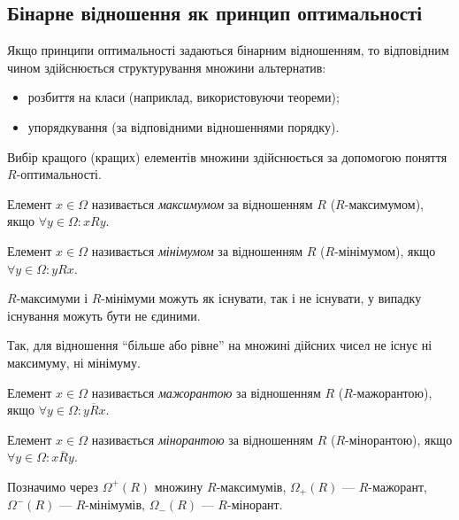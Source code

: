 \subsection{Бінарне відношення як принцип оптимальності}

Якщо принципи оптимальності задаються бінарним відношенням, то відповідним чином здійснюється структурування множини альтернатив:

\begin{itemize}
	\item розбиття на класи (наприклад, використовуючи теореми);
	\item упорядкування (за відповідними відношеннями порядку).
\end{itemize}

Вибір кращого (кращих) елементів множини здійснюється за допомогою поняття $R$-оптимальності.

\begin{definition}[$R$-максимуму]
	Елемент $x \in \Omega$ називається \textit{максимумом} за відношенням $R$ ($R$-максимумом), якщо $\forall y \in \Omega: x R y$.
\end{definition}

\begin{definition}[$R$-мінімуму]
	Елемент $x \in \Omega$ називається \textit{мінімумом} за відношенням $R$ ($R$-мінімумом), якщо $\forall y \in \Omega: y R x$.
\end{definition}

$R$-максимуми і $R$-мінімуми можуть як існувати, так і не існувати, у випадку існування можуть бути не єдиними.

\begin{example}
Так, для відношення ``більше або рівне'' на множині дійсних чисел не існує ні максимуму, ні мінімуму.
\end{example}

\begin{definition}[$R$-мажоранти]
	Елемент $x \in \Omega$ називається \textit{мажорантою} за відношенням $R$ ($R$-мажорантою), якщо $\forall y \in \Omega: y \overline{R} x$.
\end{definition}

\begin{definition}[$R$-міноранти] 
	Елемент $x \in \Omega$ називається \textit{мінорантою} за відношенням $R$ ($R$-мінорантою), якщо $\forall y \in \Omega: x \overline{R} y$.
\end{definition}

Позначимо через $\Omega^+(R)$ множину $R$-максимумів, $\Omega_+(R)$ --- $R$-мажорант, $\Omega^-(R)$ --- $R$-мінімумів, $\Omega_-(R)$ --- $R$-мінорант.


